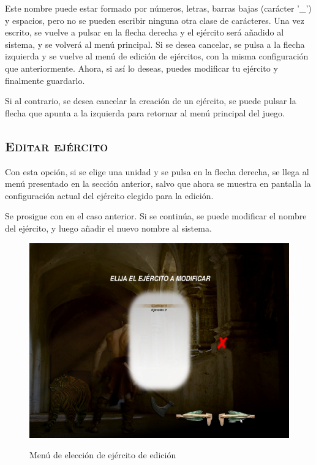 Este nombre puede estar formado por números, letras, barras bajas
(carácter '\_') y
espacios, pero no se pueden escribir ninguna otra clase de
carácteres. Una vez escrito, se vuelve a pulsar en la flecha derecha y
el ejército será añadido al sistema, y se volverá al menú
principal. Si se desea cancelar, se pulsa a la flecha izquierda y se
vuelve al menú de edición de ejércitos, con la misma configuración que
anteriormente. Ahora, si así lo deseas, puedes modificar tu ejército y
finalmente guardarlo.

Si al contrario, se desea cancelar la creación de un ejército, se
puede pulsar la flecha que apunta a la izquierda para retornar al menú
principal del juego.

\subsection*{\textsc{Editar ejército}}
Con esta opción, si se elige una unidad y se pulsa en la flecha
derecha, se llega al menú presentado en la sección anterior, salvo que
ahora se muestra en pantalla la configuración actual del ejército
elegido para la edición.

Se prosigue con en el caso anterior. Si se continúa, se puede
modificar el nombre del ejército, y luego añadir el nuevo nombre al
sistema.

\begin{figure}[h]
\centering
\includegraphics[scale=.4]{./imagenes/elegirejercito.png}
\label{fig:elegirejercito}
\caption{Menú de elección de ejército de edición}
\end{figure}

